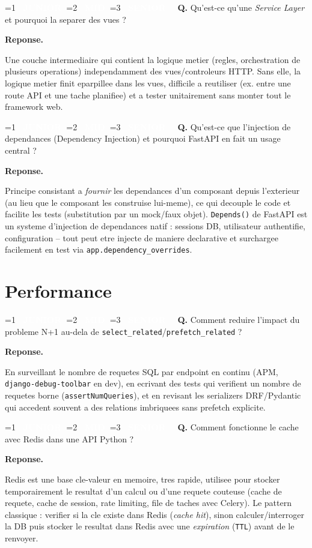 \documentclass[11pt,a4paper]{article}
\newcommand{\badgeJ}{\textcolor{white}{\colorbox{junior}{\small\bfseries\ JUNIOR\ }}}
\newcommand{\badgeM}{\textcolor{white}{\colorbox{mid}{\small\bfseries\ MID\ }}}
\newcommand{\badgeS}{\textcolor{white}{\colorbox{senior}{\small\bfseries\ SENIOR\ }}}
\newcounter{qcount}
\newenvironment{qa}[2]{%
  \stepcounter{qcount}%
  \par\vspace{6pt}%
  \noindent\colorbox{qbg}{\parbox{\dimexpr\linewidth-12pt}{\vspace{2pt}%
  \ifnum#1=1 \badgeJ\fi\ifnum#1=2 \badgeM\fi\ifnum#1=3 \badgeS\fi
  \ \textbf{Q\theqcount.} #2\vspace{2pt}}}\par\vspace{4pt}%
  \noindent\textbf{\color{accent}Reponse.}\ \ignorespaces
}{%
  \par\vspace{8pt}%
}
\begin{document}
\begin{qa}{2}{Qu'est-ce qu'une \emph{Service Layer} et pourquoi la separer des vues ?}
Une couche intermediaire qui contient la logique metier (regles, orchestration
de plusieurs operations) independamment des vues/controleurs HTTP. Sans elle,
la logique metier finit eparpillee dans les vues, difficile a reutiliser
(ex. entre une route API et une tache planifiee) et a tester unitairement
sans monter tout le framework web.
\end{qa}

\begin{qa}{2}{Qu'est-ce que l'injection de dependances (Dependency Injection) et pourquoi FastAPI en fait un usage central ?}
Principe consistant a \emph{fournir} les dependances d'un composant depuis
l'exterieur (au lieu que le composant les construise lui-meme), ce qui
decouple le code et facilite les tests (substitution par un mock/faux
objet). \texttt{Depends()} de FastAPI est un systeme d'injection de
dependances natif : sessions DB, utilisateur authentifie, configuration --
tout peut etre injecte de maniere declarative et surchargee facilement en
test via \texttt{app.dependency\_overrides}.
\end{qa}

\newpage
\section{Performance}

\begin{qa}{2}{Comment reduire l'impact du probleme N+1 au-dela de \texttt{select\_related}/\texttt{prefetch\_related} ?}
En surveillant le nombre de requetes SQL par endpoint en continu (APM,
\texttt{django-debug-toolbar} en dev), en ecrivant des tests qui verifient un
nombre de requetes borne (\texttt{assertNumQueries}), et en revisant les
serializers DRF/Pydantic qui accedent souvent a des relations imbriquees sans
prefetch explicite.
\end{qa}

\begin{qa}{2}{Comment fonctionne le cache avec Redis dans une API Python ?}
Redis est une base cle-valeur en memoire, tres rapide, utilisee pour stocker
temporairement le resultat d'un calcul ou d'une requete couteuse (cache de
requete, cache de session, rate limiting, file de taches avec Celery). Le
pattern classique : verifier si la cle existe dans Redis (\emph{cache hit}),
sinon calculer/interroger la DB puis stocker le resultat dans Redis avec une
\emph{expiration} (\texttt{TTL}) avant de le renvoyer.
\end{qa}
\end{document}
